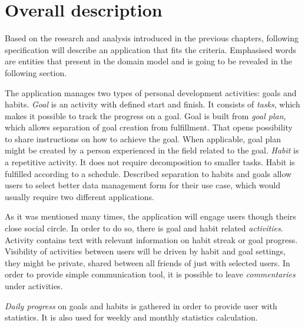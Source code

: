 
\section{Overall description}\label{sec:overall-description}

Based on the research and analysis introduced in the previous chapters, following specification will describe an application that fits the criteria.
Emphasised words are entities that present in the domain model and is going to be revealed in the following section.

The application manages two types of personal development activities: goals and habits.
\textit{Goal} is an activity with defined start and finish.
It consists of \textit{tasks}, which makes it possible to track the progress on a goal.
Goal is built from \textit{goal plan}, which allows separation of goal creation from fulfillment.
That opens possibility to share instructions on how to achieve the goal.
When applicable, goal plan might be created by a person experienced in the field related to the goal.
\textit{Habit} is a repetitive activity.
It does not require decomposition to smaller tasks.
Habit is fulfilled according to a schedule.
Described separation to habits and goals allow users to select better data management form for their use case, which would usually require two different applications.

As it was mentioned many times, the application will engage users though theirs close social circle.
In order to do so, there is goal and habit related \textit{activities}.
Activity contains text with relevant information on habit streak or goal progress.
Visibility of activities between users will be driven by habit and goal settings, they might be private, shared between all friends of just with selected users.
In order to provide simple communication tool, it is possible to leave \textit{commentaries} under activities.

\textit{Daily progress} on goals and habits is gathered in order to provide user with statistics.
It is also used for weekly and monthly statistics calculation.